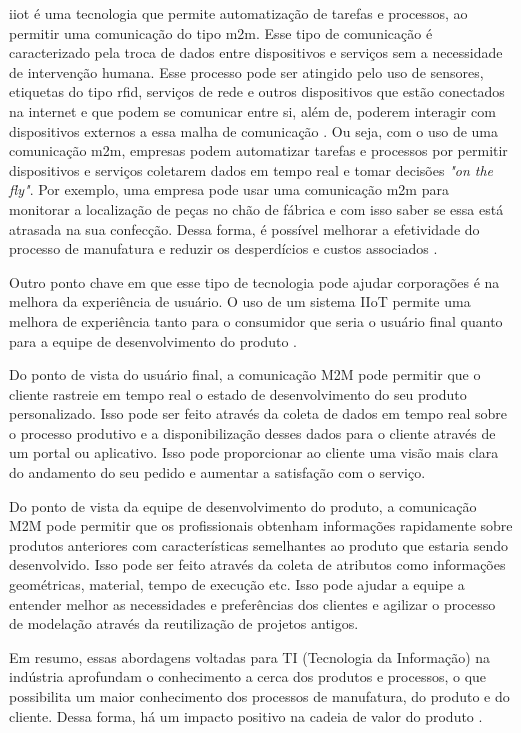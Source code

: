 \acrshort{iiot} é uma tecnologia que permite automatização de tarefas e processos, ao permitir uma comunicação do tipo \acrfull{m2m}. Esse tipo de comunicação é caracterizado pela troca de dados entre dispositivos e serviços sem a necessidade de intervenção humana. Esse processo pode ser atingido pelo uso de sensores, etiquetas do tipo \acrfull{rfid}, serviços de rede e outros dispositivos que estão conectados na internet e que podem se comunicar entre si, além de, poderem interagir com dispositivos externos a essa malha de comunicação \cite{KhanIoT}. Ou seja, com o uso de uma comunicação \acrshort{m2m}, empresas podem automatizar tarefas e processos por permitir dispositivos e serviços coletarem dados em tempo real e tomar decisões \emph{"on the fly"}. Por exemplo, uma empresa pode usar uma comunicação \acrshort{m2m} para monitorar a localização de peças no chão de fábrica e com isso saber se essa está atrasada na sua confecção. Dessa forma, é possível melhorar a efetividade do processo de manufatura e reduzir os desperdícios e custos associados \cite{SeungSME}. 


Outro ponto chave em que esse tipo de tecnologia pode ajudar corporações é na melhora da experiência de usuário. O uso de um sistema IIoT permite uma melhora de experiência tanto para o consumidor que seria o usuário final quanto para a equipe de desenvolvimento do produto \cite{Grabowska+2020+90+96}.

Do ponto de vista do usuário final, a comunicação M2M pode permitir que o cliente rastreie em tempo real o estado de desenvolvimento do seu produto personalizado. Isso pode ser feito através da coleta de dados em tempo real sobre o processo produtivo e a disponibilização desses dados para o cliente através de um portal ou aplicativo. Isso pode proporcionar ao cliente uma visão mais clara do andamento do seu pedido e aumentar a satisfação com o serviço.


Do ponto de vista da equipe de desenvolvimento do produto, a comunicação M2M pode permitir que os profissionais obtenham informações rapidamente sobre produtos anteriores com características semelhantes ao produto que estaria sendo desenvolvido. Isso pode ser feito através da coleta de atributos como informações geométricas, material, tempo de execução etc. Isso pode ajudar a equipe a entender melhor as necessidades e preferências dos clientes e agilizar o processo de modelação através da reutilização de projetos antigos.

Em resumo, essas abordagens voltadas para TI (Tecnologia da Informação) na indústria aprofundam o conhecimento a cerca dos produtos e processos, o que possibilita um maior conhecimento dos processos de manufatura, do produto e do cliente. Dessa forma, há um impacto positivo na cadeia de valor do produto \cite{economies6030046}.


